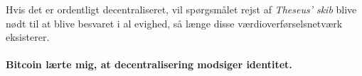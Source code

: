 Hvis det er ordentligt decentraliseret, vil spørgsmålet rejst af 
\textit{Theseus' skib} blive nødt til at blive besvaret i al evighed, så længe
disse værdioverførselsnetværk eksisterer.

\paragraph{Bitcoin lærte mig, at decentralisering modsiger identitet.}

%
%
%
%
